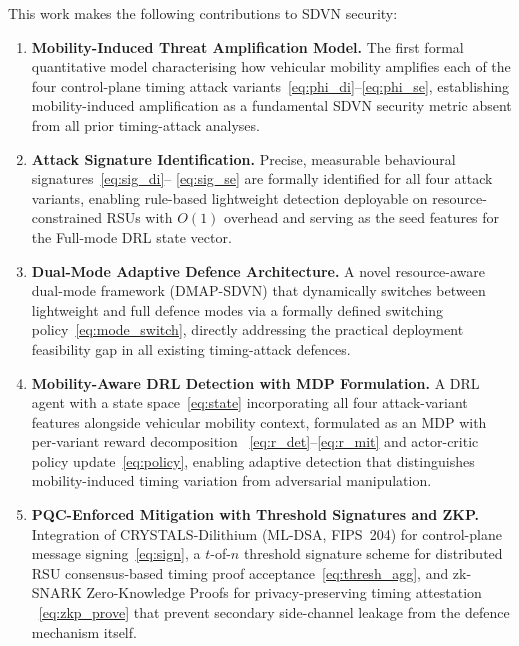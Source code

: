 This work makes the following contributions to SDVN security:

\begin{enumerate}

\item \textbf{Mobility-Induced Threat Amplification Model.}
The first formal quantitative model characterising how vehicular
mobility amplifies each of the four control-plane timing attack
variants~\eqref{eq:phi_di}--\eqref{eq:phi_se}, establishing
mobility-induced amplification as a fundamental SDVN security
metric absent from all prior timing-attack analyses.

\item \textbf{Attack Signature Identification.}
Precise, measurable behavioural signatures~\eqref{eq:sig_di}--
\eqref{eq:sig_se} are formally identified for all four attack
variants, enabling rule-based lightweight detection deployable
on resource-constrained RSUs with $O(1)$ overhead and serving
as the seed features for the Full-mode DRL state vector.

\item \textbf{Dual-Mode Adaptive Defence Architecture.}
A novel resource-aware dual-mode framework (DMAP-SDVN) that
dynamically switches between lightweight and full defence modes
via a formally defined switching policy~\eqref{eq:mode_switch},
directly addressing the practical deployment feasibility gap
in all existing timing-attack defences.

\item \textbf{Mobility-Aware DRL Detection with MDP Formulation.}
A DRL agent with a state space~\eqref{eq:state} incorporating all
four attack-variant features alongside vehicular mobility context,
formulated as an MDP with per-variant reward decomposition~
\eqref{eq:r_det}--\eqref{eq:r_mit} and actor-critic policy
update~\eqref{eq:policy}, enabling adaptive detection that
distinguishes mobility-induced timing variation from adversarial
manipulation.

\item \textbf{PQC-Enforced Mitigation with Threshold Signatures
and ZKP.} Integration of CRYSTALS-Dilithium (ML-DSA, FIPS~204)
for control-plane message signing~\eqref{eq:sign}, a $t$-of-$n$
threshold signature scheme for distributed RSU consensus-based
timing proof acceptance~\eqref{eq:thresh_agg}, and zk-SNARK
Zero-Knowledge Proofs for privacy-preserving timing attestation
~\eqref{eq:zkp_prove} that prevent secondary side-channel leakage
from the defence mechanism itself.


\end{enumerate}

